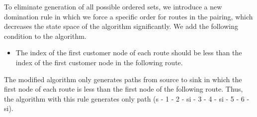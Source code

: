 To eliminate generation of all possible ordered sets, we introduce a new 
domination rule in which we force a specific order for routes in the pairing, 
which decreases the state space of the algorithm significantly. We add
the following condition to the algorithm. 
\begin{itemize}
\item [{\bf Rule}] The index of the first customer node of each route should be less 
than the index of the first customer node in the following route.
\end{itemize}
The modified algorithm only generates paths from source to sink in which the first 
node of each route is less than the first node of the following route. 
Thus, the algorithm with this rule generates only path 
(s - 1 - 2 - si - 3 - 4 - si - 5 - 6 - si). 


